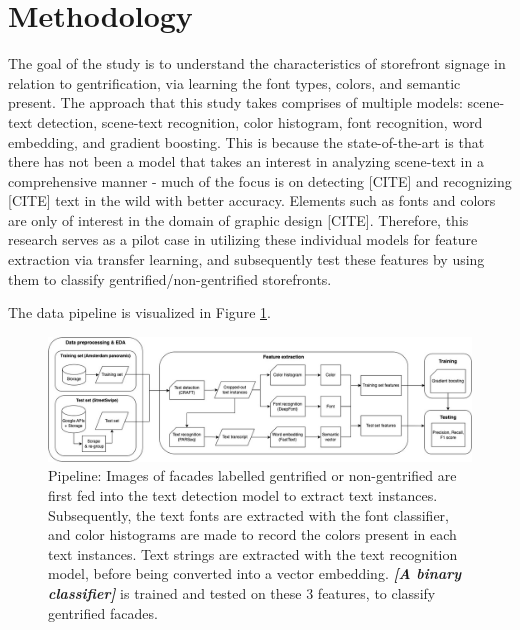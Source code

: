 \section{Methodology}
\label{sec:methodology}

The goal of the study is to understand the characteristics of storefront signage in relation to gentrification, via learning the font types, colors, and semantic present. The approach that this study takes comprises of multiple models: scene-text detection, scene-text recognition, color histogram, font recognition, word embedding, and gradient boosting. This is because the state-of-the-art is that there has not been a model that takes an interest in analyzing scene-text in a comprehensive manner - much of the focus is on detecting [CITE] and recognizing [CITE] text in the wild with better accuracy. Elements such as fonts and colors are only of interest in the domain of graphic design [CITE]. Therefore, this research serves as a pilot case in utilizing these individual models for feature extraction via transfer learning, and subsequently test these features by using them to classify gentrified/non-gentrified storefronts.

The data pipeline is visualized in Figure \ref{fig:pipeline}.

\begin{figure}[]
    \centering
    \includegraphics[width=\textwidth]{media/methodology/Pipeline.jpg}
    \caption{Pipeline: Images of facades labelled gentrified or non-gentrified are first fed into the text detection model to extract text instances. Subsequently, the text fonts are extracted with the font classifier, and color histograms are made to record the colors present in each text instances. Text strings are extracted with the text recognition model, before being converted into a vector embedding. \textbf{\textit{[A binary classifier]}} is trained and tested on these 3 features, to classify gentrified facades.}
    \label{fig:pipeline}
\end{figure}

